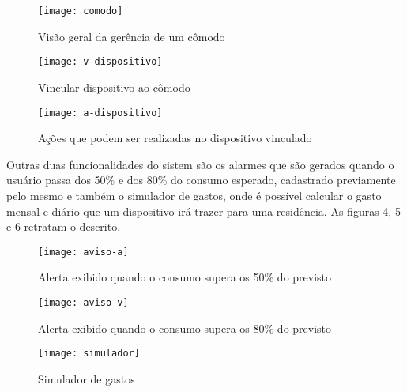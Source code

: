 \begin{figure}[h!]
	\texttt{[image: comodo]}
	\centering
	\caption[Visão geral da gerência de um cômodo]{Visão geral da gerência de um cômodo}
	\label{fig:comodo-ft} 
\end{figure}
\FloatBarrier

\begin{figure}[h!]
	\texttt{[image: v-dispositivo]}
	\centering
	\caption[Vincular dispositivo ao cômodo]{Vincular dispositivo ao cômodo}
	\label{fig:v-dispositivo} 
\end{figure}
\FloatBarrier

\begin{figure}[h!]
	\texttt{[image: a-dispositivo]}
	\centering
	\caption[Ações que podem ser realizadas no dispositivo vinculado]{Ações que podem ser realizadas no dispositivo vinculado}
	\label{fig:a-dispositivo} 
\end{figure}
\FloatBarrier

Outras duas funcionalidades do sistem são os alarmes que são gerados quando o usuário passa dos 50\% e dos 80\% do consumo esperado, cadastrado previamente pelo mesmo e
também o simulador de gastos, onde é possível calcular o gasto mensal e diário que um dispositivo irá trazer para uma residência. As figuras
\ref{fig:aviso-a}, \ref{fig:aviso-v} e \ref{fig:simulador} retratam o descrito.

\begin{figure}[h!]
	\texttt{[image: aviso-a]}
	\centering
	\caption[Alerta exibido quando o consumo supera os 50\% do previsto]{Alerta exibido quando o consumo supera os 50\% do previsto}
	\label{fig:aviso-a} 
\end{figure}
\FloatBarrier

\begin{figure}[h!]
	\texttt{[image: aviso-v]}
	\centering
	\caption[Alerta exibido quando o consumo supera os 80\% do previsto]{Alerta exibido quando o consumo supera os 80\% do previsto}
	\label{fig:aviso-v} 
\end{figure}
\FloatBarrier

\begin{figure}[h!]
	\texttt{[image: simulador]}
	\centering
	\caption[Simulador de gastos]{Simulador de gastos}
	\label{fig:simulador} 
\end{figure}
\FloatBarrier


